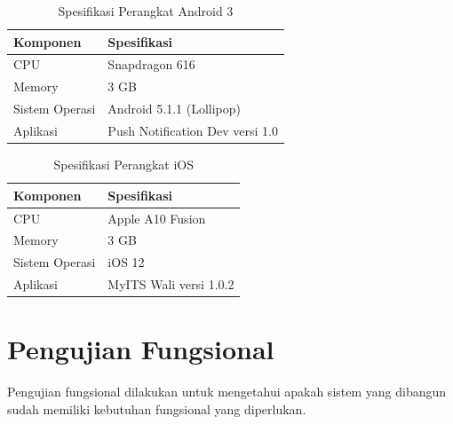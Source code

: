 \begin{longtable}{|p{3cm}|p{6cm}|}
\caption{Spesifikasi Perangkat Android 3} \label{t:spec-android-3} \\ \hline
\rowcolor{lightgray} Komponen & Spesifikasi \\ \hline
\endhead
CPU & Snapdragon 616 \\ \hline
Memory & 3 GB \\ \hline
Sistem Operasi & Android 5.1.1 (Lollipop) \\ \hline
Aplikasi & Push Notification Dev versi 1.0 \\ \hline
\end{longtable}
\begin{longtable}{|p{3cm}|p{6cm}|}
	\caption{Spesifikasi Perangkat iOS} \label{t:spec-ios} \\ \hline
	\rowcolor{lightgray} Komponen & Spesifikasi \\ \hline
	\endhead
    CPU & Apple A10 Fusion \\ \hline
    Memory & 3 GB \\ \hline
    Sistem Operasi & iOS 12 \\ \hline
    Aplikasi & MyITS Wali versi 1.0.2 \\ \hline
\end{longtable}

\section{Pengujian Fungsional}
\par Pengujian fungsional dilakukan untuk mengetahui apakah sistem yang dibangun sudah memiliki kebutuhan fungsional yang diperlukan.

